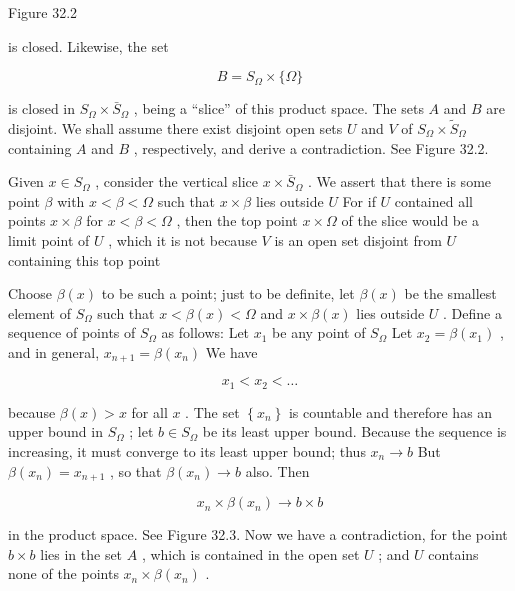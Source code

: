 Figure 32.2

is closed. Likewise, the set

\[
B = {S}_{\Omega } \times  \{ \Omega \}
\]

is closed in \({S}_{\Omega } \times  {\bar{S}}_{\Omega }\) , being a ``slice'' of this product space. The sets \(A\) and \(B\) are disjoint. We shall assume there exist disjoint open sets \(U\) and \(V\) of \({S}_{\Omega } \times  {\widetilde{S}}_{\Omega }\) containing \(A\) and \(B\) , respectively, and derive a contradiction. See Figure 32.2.

Given \(x \in  {S}_{\Omega }\) , consider the vertical slice \(x \times  {\bar{S}}_{\Omega }\) . We assert that there is some point \(\beta\) with \(x < \beta  < \Omega\) such that \(x \times  \beta\) lies outside \(U\) For if \(U\) contained all points \(x \times  \beta\) for \(x < \beta  < \Omega\) , then the top point \(x \times  \Omega\) of the slice would be a limit point of \(U\) , which it is not because \(V\) is an open set disjoint from \(U\) containing this top point

Choose \(\beta \left( x\right)\) to be such a point; just to be definite, let \(\beta \left( x\right)\) be the smallest element of \({S}_{\Omega }\) such that \(x < \beta \left( x\right)  < \Omega\) and \(x \times  \beta \left( x\right)\) lies outside \(U\) . Define a sequence of points of \({S}_{\Omega }\) as follows: Let \({x}_{1}\) be any point of \({S}_{\Omega }\) Let \({x}_{2} = \beta \left( {x}_{1}\right)\) , and in general, \({x}_{n + 1} = \beta \left( {x}_{n}\right)\) We have

\[
{x}_{1} < {x}_{2} < \ldots
\]

because \(\beta \left( x\right)  > x\) for all \(x\) . The set \(\left\{  {x}_{n}\right\}\) is countable and therefore has an upper bound in \({S}_{\Omega }\) ; let \(b \in  {S}_{\Omega }\) be its least upper bound. Because the sequence is increasing, it must converge to its least upper bound; thus \({x}_{n} \rightarrow  b\) But \(\beta \left( {x}_{n}\right)  = {x}_{n + 1}\) , so that \(\beta \left( {x}_{n}\right)  \rightarrow  b\) also. Then

\[
{x}_{n} \times  \beta \left( {x}_{n}\right)  \rightarrow  b \times  b
\]

in the product space. See Figure 32.3. Now we have a contradiction, for the point \(b \times  b\) lies in the set \(A\) , which is contained in the open set \(U\) ; and \(U\) contains none of the points \({x}_{n} \times  \beta \left( {x}_{n}\right)\) .

